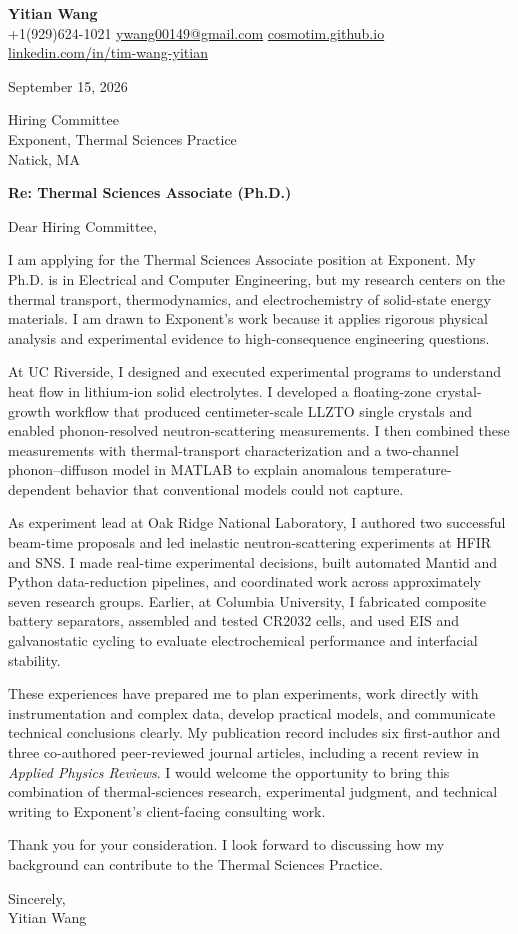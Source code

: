 \documentclass[11pt]{article}
\begin{document}
{\Large \textbf{Yitian Wang}}\\
+1(929)624-1021 \quad
\href{mailto:ywang00149@gmail.com}{ywang00149@gmail.com} \quad
\href{https://cosmotim.github.io}{cosmotim.github.io}\\
\href{https://linkedin.com/in/tim-wang-yitian}{linkedin.com/in/tim-wang-yitian}

\vspace{1em}
September 15, 2026

Hiring Committee\\
Exponent, Thermal Sciences Practice\\
Natick, MA

\textbf{Re: Thermal Sciences Associate (Ph.D.)}

Dear Hiring Committee,

I am applying for the Thermal Sciences Associate position at Exponent. My Ph.D. is in Electrical and Computer Engineering, but my research centers on the thermal transport, thermodynamics, and electrochemistry of solid-state energy materials. I am drawn to Exponent's work because it applies rigorous physical analysis and experimental evidence to high-consequence engineering questions.

At UC Riverside, I designed and executed experimental programs to understand heat flow in lithium-ion solid electrolytes. I developed a floating-zone crystal-growth workflow that produced centimeter-scale LLZTO single crystals and enabled phonon-resolved neutron-scattering measurements. I then combined these measurements with thermal-transport characterization and a two-channel phonon--diffuson model in MATLAB to explain anomalous temperature-dependent behavior that conventional models could not capture.

As experiment lead at Oak Ridge National Laboratory, I authored two successful beam-time proposals and led inelastic neutron-scattering experiments at HFIR and SNS. I made real-time experimental decisions, built automated Mantid and Python data-reduction pipelines, and coordinated work across approximately seven research groups. Earlier, at Columbia University, I fabricated composite battery separators, assembled and tested CR2032 cells, and used EIS and galvanostatic cycling to evaluate electrochemical performance and interfacial stability.

These experiences have prepared me to plan experiments, work directly with instrumentation and complex data, develop practical models, and communicate technical conclusions clearly. My publication record includes six first-author and three co-authored peer-reviewed journal articles, including a recent review in \textit{Applied Physics Reviews}. I would welcome the opportunity to bring this combination of thermal-sciences research, experimental judgment, and technical writing to Exponent's client-facing consulting work.

Thank you for your consideration. I look forward to discussing how my background can contribute to the Thermal Sciences Practice.

Sincerely,\\[1.5em]
Yitian Wang
\end{document}
